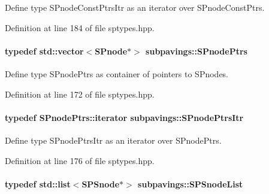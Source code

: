 \-Define type \-S\-Pnode\-Const\-Ptrs\-Itr as an iterator over \-S\-Pnode\-Const\-Ptrs. 



\-Definition at line 184 of file sptypes.\-hpp.

\hypertarget{namespacesubpavings_ad64ec5e254ada5d913b9f7b46dcddc49}{
\paragraph[{\-S\-Pnode\-Ptrs}]{\setlength{\rightskip}{0pt plus 5cm}typedef std\-::vector$<${\bf \-S\-Pnode}$\ast$$>$ {\bf subpavings\-::\-S\-Pnode\-Ptrs}}}\label{namespacesubpavings_ad64ec5e254ada5d913b9f7b46dcddc49}


\-Define type \-S\-Pnode\-Ptrs as container of pointers to \-S\-Pnodes. 



\-Definition at line 172 of file sptypes.\-hpp.

\hypertarget{namespacesubpavings_aa5240e1b99487f2c24014904cf761fc6}{
\paragraph[{\-S\-Pnode\-Ptrs\-Itr}]{\setlength{\rightskip}{0pt plus 5cm}typedef \-S\-Pnode\-Ptrs\-::iterator {\bf subpavings\-::\-S\-Pnode\-Ptrs\-Itr}}}\label{namespacesubpavings_aa5240e1b99487f2c24014904cf761fc6}


\-Define type \-S\-Pnode\-Ptrs\-Itr as an iterator over \-S\-Pnode\-Ptrs. 



\-Definition at line 176 of file sptypes.\-hpp.

\hypertarget{namespacesubpavings_ae7645253328c3b5fc137829039d971e3}{
\paragraph[{\-S\-P\-Snode\-List}]{\setlength{\rightskip}{0pt plus 5cm}typedef std\-::list$<${\bf \-S\-P\-Snode}$\ast$$>$ {\bf subpavings\-::\-S\-P\-Snode\-List}}}\label{namespacesubpavings_ae7645253328c3b5fc137829039d971e3}


